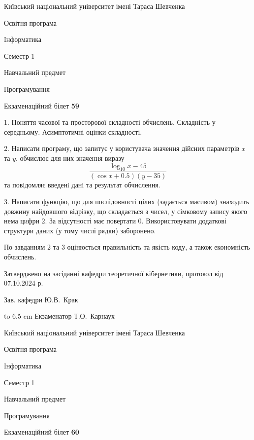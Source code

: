 \documentclass[12pt, ukrainian]{article}
\begin{document}
{{\begin {scriptsize}\par
{ \center  Київський національний університет імені Тараса Шевченка \par}
{\parbox {5 cm}{Освітня програма \hfill}{\parbox {7 cm}{Інформатика\hfill}}\parbox {6 cm}{\hfill Семестр 1}}\par
{\parbox {5 cm} {Навчальний предмет \hfill}\parbox {7 cm}{Програмування \hfill}\parbox {6cm}{\hfill}\par}\vspace{-15pt} \end{scriptsize}}{\center Екзаменаційний білет \No \textbf { 59 }\par}}
{%
1. Поняття часової та просторової складності обчислень. Складність у середньому. Асимптотичні оцінки складності.%
\par
2. Написати програму, що запитує у користувача значення дійсних параметрів $x$ та $y$, обчислює для них значення виразу 
$$\frac{\log_{10} x - 45}{(\cos x + 0.5) (y - 35)}$$ 
та повiдомляє введенi данi та результат обчислення.

\par
3. Написати функцію, що для послідовності цілих (задається масивом) знаходить довжину найдовшого відрізку, що складається з чисел, у сімковому запису якого нема цифри 2. За відсутності має повертати $0$. Використовувати додаткові структури даних (у тому числі рядки) заборонено.

По завданням 2 та 3 оцінюється правильність та якість коду, а також економність обчислень.

}
{\smallskip\smallskip \begin {scriptsize} Затверджено на засіданні кафедри теоретичної кібернетики, протокол   від   07.10.2024 р.\par\smallskip\smallskip\smallskip\smallskip
{\parbox {6.5 cm} {Зав. кафедри \dotfill Ю.В.~Крак}}\hspace {0.7cm} {\hbox to 6.5 cm { Екзаменатор \dotfill Т.О.~Карнаух}} \end{scriptsize}}
\vspace{0.9cm}
{{\begin {scriptsize}\par
{ \center  Київський національний університет імені Тараса Шевченка \par}
{\parbox {5 cm}{Освітня програма \hfill}{\parbox {7 cm}{Інформатика\hfill}}\parbox {6 cm}{\hfill Семестр 1}}\par
{\parbox {5 cm} {Навчальний предмет \hfill}\parbox {7 cm}{Програмування \hfill}\parbox {6cm}{\hfill}\par}\vspace{-15pt} \end{scriptsize}}{\center Екзаменаційний білет \No \textbf { 60 }\par}}
\end{document}
